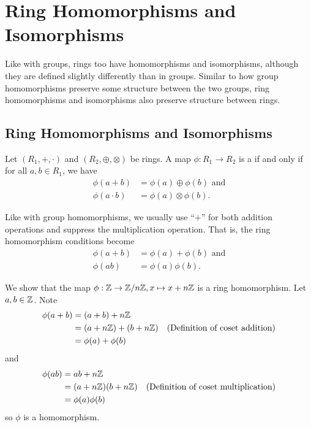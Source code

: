 \chapter{Ring Homomorphisms and Isomorphisms}
Like with groups, rings too have homomorphisms and isomorphisms, although they are defined slightly differently than in groups. Similar to how group homomorphisms preserve some structure between the two groups, ring homomorphisms and isomorphisms also preserve structure between rings.

\section{Ring Homomorphisms and Isomorphisms}
\begin{definition}
    Let $(R_1, +, \cdot)$ and $(R_2, \oplus, \otimes)$ be rings. A map $\phi: R_1 \to R_2$ is a  if and only if for all $a, b \in R_1$, we have
    \begin{align*}
        \phi(a+b) &= \phi(a) \oplus \phi(b) \text{ and}\\
        \phi(a\cdot b) &= \phi(a)\otimes\phi(b).
    \end{align*}
\end{definition}
\begin{remark}
    Like with group homomorphisms, we usually use ``$+$'' for both addition operations and suppress the multiplication operation. That is, the ring homomorphism conditions become
    \begin{align*}
        \phi(a+b) &= \phi(a) + \phi(b) \text{ and}\\
        \phi(ab) &= \phi(a)\phi(b).
    \end{align*}
\end{remark}

\begin{example}
    We show that the map $\phi: \mathbb{Z} \to \mathbb{Z}/n\mathbb{Z}, x \mapsto x + n\mathbb{Z}$ is a ring homomorphism. Let $a, b \in \mathbb{Z}$. Note
    \begin{align*}
        \phi(a+b) &= (a+b) + n\mathbb{Z}\\
        &= (a + n\mathbb{Z}) + (b + n\mathbb{Z}) & (\text{Definition of coset addition})\\
        &=\phi(a)+\phi(b)
    \end{align*}
    and
    \begin{align*}
        \phi(ab) &= ab + n\mathbb{Z}\\
        &= (a + n\mathbb{Z})(b + n\mathbb{Z}) & (\text{Definition of coset multiplication})\\
        &= \phi(a)\phi(b)
    \end{align*}
    so $\phi$ is a homomorphism.
\end{example}

